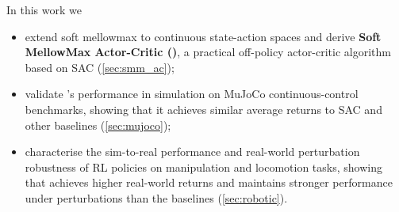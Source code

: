 \documentclass{article} %
\newcommand{\john}[1]{{\footnotesize \color{purple} John: {#1}}}
\begin{document}
    In this work we
    \begin{itemize}[leftmargin=*, nosep]
        \item extend soft mellowmax to continuous state-action spaces and derive \textbf{Soft MellowMax Actor-Critic (\ourMethod)}, a practical off-policy actor-critic algorithm based on SAC (\autoref{sec:smm_ac});
        \item validate \ourMethod's performance in simulation on MuJoCo continuous-control benchmarks, showing that it achieves similar average returns to SAC and other baselines (\autoref{sec:mujoco});
        \item characterise the sim-to-real performance and real-world perturbation robustness of RL policies on manipulation and locomotion tasks, showing that \ourMethod achieves higher real-world returns and maintains stronger performance under perturbations than the baselines (\autoref{sec:robotic}).
    \end{itemize}
    

\end{document}
